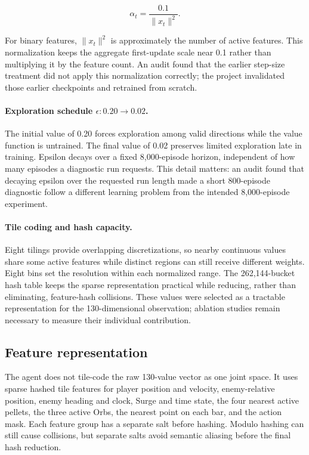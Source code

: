 \documentclass[11pt]{article}
\begin{document}
\begin{equation}
  \alpha_t = \frac{0.1}{\lVert x_t \rVert^2}.
\end{equation}

For binary features, $\lVert x_t \rVert^2$ is approximately the number of
active features. This normalization keeps the aggregate first-update scale
near 0.1 rather than multiplying it by the feature count. An audit found that
the earlier step-size treatment did not apply this normalization correctly;
the project invalidated those earlier checkpoints and retrained from scratch.

\paragraph{Exploration schedule $\epsilon: 0.20 \rightarrow 0.02$.}
The initial value of 0.20 forces exploration among valid directions while the
value function is untrained. The final value of 0.02 preserves limited
exploration late in training. Epsilon decays over a fixed 8,000-episode
horizon, independent of how many episodes a diagnostic run requests. This
detail matters: an audit found that decaying epsilon over the requested run
length made a short 800-episode diagnostic follow a different learning problem
from the intended 8,000-episode experiment.

\paragraph{Tile coding and hash capacity.}
Eight tilings provide overlapping discretizations, so nearby continuous values
share some active features while distinct regions can still receive different
weights. Eight bins set the resolution within each normalized range. The
262,144-bucket hash table keeps the sparse representation practical while
reducing, rather than eliminating, feature-hash collisions. These values were
selected as a tractable representation for the 130-dimensional observation;
ablation studies remain necessary to measure their individual contribution.

\subsection{Feature representation}

The agent does not tile-code the raw 130-value vector as one joint space. It
uses sparse hashed tile features for player position and velocity,
enemy-relative position, enemy heading and clock, Surge and time state, the
four nearest active pellets, the three active Orbs, the nearest point on each
bar, and the action mask. Each feature group has a separate salt before
hashing. Modulo hashing can still cause collisions, but separate salts avoid
semantic aliasing before the final hash reduction.
\end{document}
